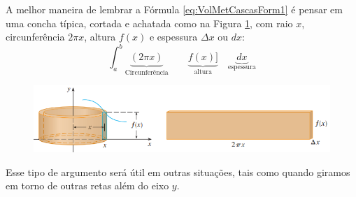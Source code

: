 \cleardoublepage\documentclass[../main.tex]{subfiles}
\begin{document}
A melhor maneira de lembrar a Fórmula \eqref{eq:VolMetCascasForm1} é pensar em uma concha típica, cortada e achatada como na Figura \ref{fig:ExplicandoVolCascas}, com raio $x$, circunferência $2\pi x$, altura $f(x)$ e espessura $\Delta x$ ou $dx$:
\[\int_a^b \underbrace{(2\pi x)}_{\text{Circunferência}}\qquad\underbrace{f(x)]}_{\text{altura}}\quad \underbrace{dx}_{\text{espessura}}\]
\begin{figure}[htb]
    \centering
    \includegraphics[width=\textwidth]{figs/Volume/ExplicForm-2pixfx.png}
    \caption{}
    \label{fig:ExplicandoVolCascas}
\end{figure}
Esse tipo de argumento será útil em outras situações, tais como quando giramos em torno
de outras retas além do eixo $y$.
\end{document}
